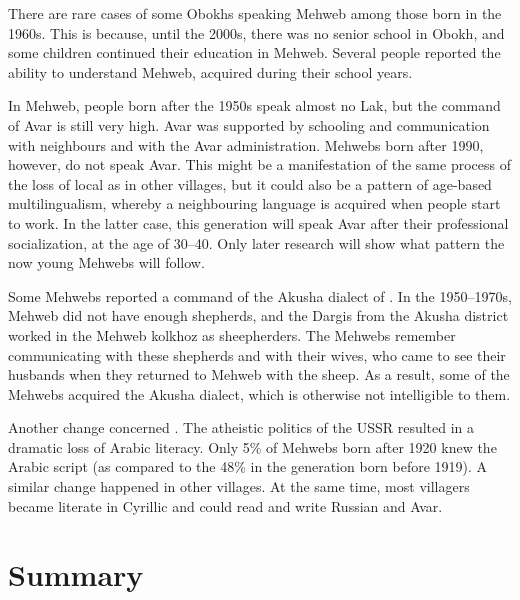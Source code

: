 \documentclass[output=paper]{langsci/langscibook}
\begin{document}
There are rare cases of some Obokhs speaking Mehweb among those born in
the 1960s. This is because, until the 2000s, there was no senior school in
Obokh, and some children continued their education in Mehweb. Several
people reported the ability to understand Mehweb, acquired during their
school years.

In Mehweb, people born after the 1950s speak almost no Lak, but the
command of Avar is still very high. Avar was supported by schooling and
communication with neighbours and with the Avar administration. Mehwebs
born after 1990, however, do not speak Avar. This might be a
manifestation of the same process of the loss of local 
as in other villages, but it could also be a pattern of age-based
multilingualism, whereby a neighbouring language is acquired when people
start to work. In the latter case, this generation will speak Avar after
their professional socialization, at the age of 30–40. Only later
research will show what pattern the now young Mehwebs will follow.

\pagebreak

Some Mehwebs reported a command of the Akusha dialect of . In the
1950–1970s, Mehweb did not have enough shepherds, and the Dargis from the
Akusha district worked in the Mehweb kolkhoz as sheepherders. The
Mehwebs remember communicating with these shepherds and with their
wives, who came to see their husbands when they returned to Mehweb with
the sheep. As a result, some of the Mehwebs acquired the Akusha dialect,
which is otherwise not intelligible to them.

Another change concerned . The atheistic politics of the USSR
resulted in a dramatic loss of Arabic literacy. Only 5\% of Mehwebs born
after 1920 knew the Arabic script (as compared to the 48\% in the
generation born before 1919). A similar change happened in other
villages. At the same time, most villagers became literate in Cyrillic
and could read and write Russian and Avar.


\section{Summary}\label{summary}
\end{document}
